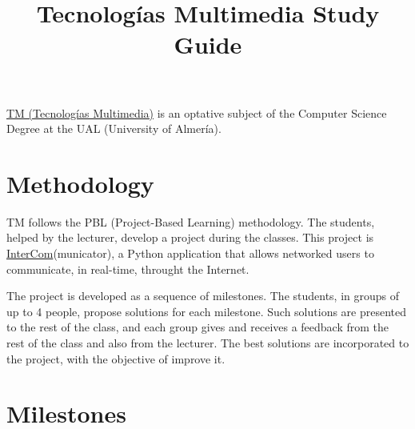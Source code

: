 
\title{Tecnologías Multimedia \newline Study Guide}

\maketitle

\href{https://www.ual.es/estudios/grados/presentacion/plandeestudios/asignatura/4015/40154321}{TM
  (Tecnologías Multimedia)} is an optative subject of the Computer
Science Degree at the UAL (University of Almería).

\section{Methodology}
TM follows the PBL (Project-Based Learning) methodology. The students,
helped by the lecturer, develop a project during the classes. This
project is
\href{https://github.com/Tecnologias-multimedia/intercom}{InterCom}(municator),
a Python application that allows networked users to communicate, in
real-time, throught the Internet.

The project is developed as a sequence of milestones. The students, in
groups of up to 4 people, propose solutions for each milestone. Such
solutions are presented to the rest of the class, and each group gives
and receives a feedback from the rest of the class and also from the
lecturer. The best solutions are incorporated to the project, with the
objective of improve it.

\section{Milestones}

